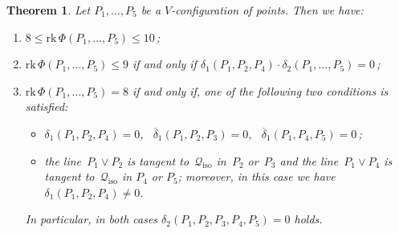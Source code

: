 \documentclass{amsart}
\theoremstyle{plain}
\newtheorem{theorem}[lemma]{Theorem}
\theoremstyle{definition}
\newcommand{\iso}{\mathcal{Q}_{\mathrm{iso}}}
\newcommand{\rk}{\ensuremath{\mathrm{rk}}}
\begin{document}
\begin{theorem}
\label{theorem:rank_V}
Let $P_1, \dots, P_5$ be a $V$-configuration of
points. Then we have:
%
\begin{enumerate}
  \item $8 \leq \rk \,\Phi(P_1, \dots, P_5) \leq 10$\,;
  \item $\rk \,\Phi(P_1, \dots, P_5) \leq 9$ if and only if
  $\delta_1(P_1, P_2, P_4) \cdot \delta_2(P_1, \dots, P_5) =0$\,;
  \item $\rk \,\Phi(P_1, \dots, P_5) = 8$ if and only if, one of
  the following two conditions is satisfied:
  \begin{itemize}
    \item $\delta_1(P_1, P_2, P_4) = 0$, \
    $\overline{\delta}_1(P_1, P_2, P_3) = 0$, \ 
    $\overline{\delta}_1(P_1, P_4, P_5) = 0$\,;
    \item the line~$P_1 \vee P_2$ is tangent to~$\iso$ in~$P_2$ or~$P_3$
    and the line~$P_1 \vee P_4$ is tangent to~$\iso$ in $P_4$ or $P_5$; 
    moreover, in this case we have $\delta_1(P_1, P_2, P_4) \neq 0$.
  \end{itemize}
  In particular, in both cases $\delta_2(P_1, P_2, P_3, P_4, P_5) = 0$ holds.
\end{enumerate}
%
\end{theorem}
\end{document}
